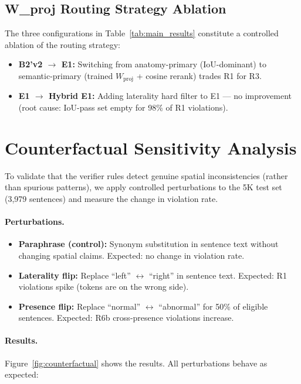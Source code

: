\documentclass[11pt,a4paper]{article}
\begin{document}
\subsection{W\_proj Routing Strategy Ablation}

The three configurations in Table~\ref{tab:main_results} constitute a controlled ablation of the routing strategy:
\begin{itemize}[nosep]
\item \textbf{B2'v2 $\to$ E1:} Switching from anatomy-primary (IoU-dominant) to semantic-primary (trained $W_{\mathrm{proj}}$ + cosine rerank) trades R1 for R3.
\item \textbf{E1 $\to$ Hybrid E1:} Adding laterality hard filter to E1 --- no improvement (root cause: IoU-pass set empty for 98\% of R1 violations).
\end{itemize}


\section{Counterfactual Sensitivity Analysis}
\label{sec:counterfactual}

To validate that the verifier rules detect genuine spatial inconsistencies (rather than spurious patterns), we apply controlled perturbations to the 5K test set (3,979 sentences) and measure the change in violation rate.

\paragraph{Perturbations.}
\begin{itemize}[nosep]
\item \textbf{Paraphrase (control):} Synonym substitution in sentence text without changing spatial claims. Expected: no change in violation rate.
\item \textbf{Laterality flip:} Replace ``left'' $\leftrightarrow$ ``right'' in sentence text. Expected: R1 violations spike (tokens are on the wrong side).
\item \textbf{Presence flip:} Replace ``normal'' $\leftrightarrow$ ``abnormal'' for 50\% of eligible sentences. Expected: R6b cross-presence violations increase.
\end{itemize}

\paragraph{Results.}
Figure~\ref{fig:counterfactual} shows the results. All perturbations behave as expected:
\end{document}
